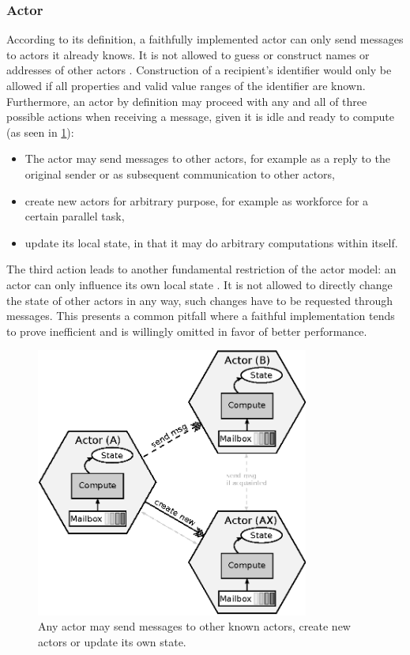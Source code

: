 \documentclass[A4]{article}
\begin{document}
\subsubsection{Actor}
According to its definition, a faithfully implemented actor can only send messages to actors it already knows. It is not allowed to guess or construct names or addresses of other actors \cite{reference/parallel/KarmaniA11}. Construction of a recipient's identifier would only be allowed if all properties and valid value ranges of the identifier are known. 
Furthermore, an actor by definition may proceed with any and all of three possible actions when receiving a message, given it is idle and ready to compute (as seen in \ref{Actors}): 
\begin{itemize}
\item The actor may send messages to other actors, for example as a reply to the original sender or as subsequent communication to other actors,
\item create new actors for arbitrary purpose, for example as workforce for a certain parallel task,
\item update its local state, in that it may do arbitrary computations within itself.
\end{itemize}
The third action leads to another fundamental restriction of the actor model: an actor can only influence its own local state . It is not allowed to directly change the state of other actors in any way, such changes have to be requested through messages\cite{reference/parallel/KarmaniA11}. This presents a common pitfall where a faithful implementation tends to prove inefficient and is willingly omitted in favor of better performance. 
\begin{figure}
\centerline{
\includegraphics[width=0.8\textwidth]{actorsExample.eps}
}
\caption{Any actor may send messages to other known actors, create new actors or update its own state.}
\label{Actors}
\end{figure}
\end{document}
